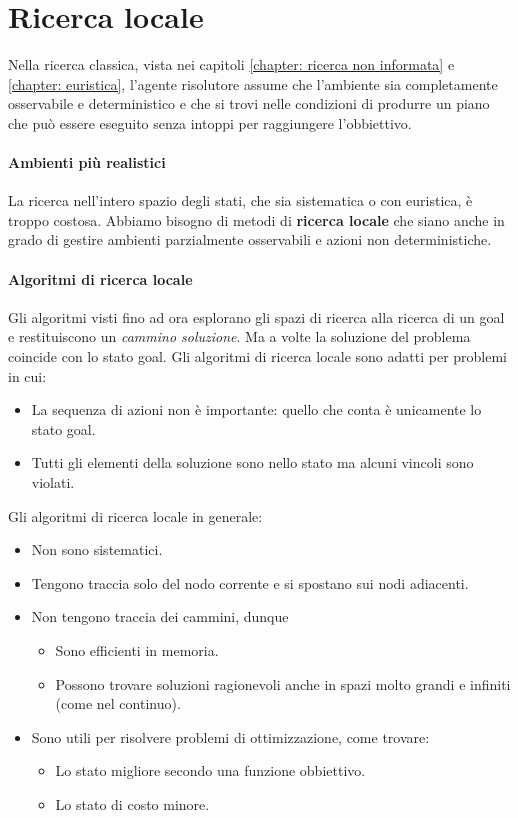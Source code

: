 \chapter{Ricerca locale}
Nella ricerca classica, vista nei capitoli \ref{chapter: ricerca non informata}
e \ref{chapter: euristica}, l'agente risolutore assume che l'ambiente sia
completamente osservabile e deterministico e che si trovi nelle condizioni di
produrre un piano che pu\`o essere eseguito senza intoppi per raggiungere
l'obbiettivo.

\subsubsection{Ambienti pi\`u realistici}
La ricerca nell'intero spazio degli stati, che sia sistematica o con euristica,
\`e troppo costosa. Abbiamo bisogno di metodi di \textbf{ricerca locale} che siano
anche in grado di gestire ambienti parzialmente osservabili e azioni non
deterministiche.

\subsubsection{Algoritmi di ricerca locale}
Gli algoritmi visti fino ad ora esplorano gli spazi di ricerca alla ricerca di un
goal e restituiscono un \emph{cammino soluzione}. Ma a volte la soluzione del problema
coincide con lo stato goal. Gli algoritmi di ricerca locale sono adatti per problemi in
cui:
\begin{itemize}
	\item La sequenza di azioni non \`e importante: quello che conta \`e unicamente
	      lo stato goal.
	\item Tutti gli elementi della soluzione sono nello stato ma alcuni vincoli sono
	      violati.
\end{itemize}
Gli algoritmi di ricerca locale in generale:
\begin{itemize}
	\item Non sono sistematici.
	\item Tengono traccia solo del nodo corrente e si spostano sui nodi adiacenti.
	\item Non tengono traccia dei cammini, dunque
	      \begin{itemize}
		      \item Sono efficienti in memoria.
		      \item Possono trovare soluzioni ragionevoli anche in spazi molto grandi e
		            infiniti (come nel continuo).
	      \end{itemize}
	\item Sono utili per risolvere problemi di ottimizzazione, come trovare:
	      \begin{itemize}
		      \item Lo stato migliore secondo una funzione obbiettivo.
		      \item Lo stato di costo minore.
	      \end{itemize}
\end{itemize}

